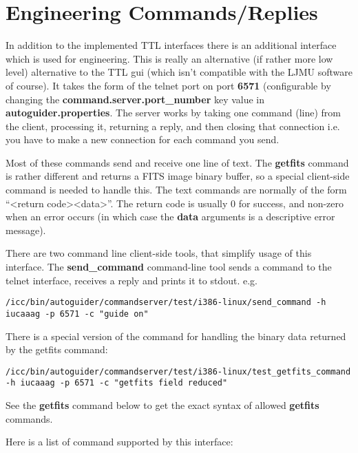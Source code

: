 \documentclass[10pt,a4paper]{article}
\begin{document}
\section{Engineering Commands/Replies}

In addition to the implemented TTL interfaces there is an additional interface which is used for engineering. This is really an alternative (if rather more low level) alternative to the TTL gui (which isn't compatible with the LJMU software of course). It takes the form of the telnet port on port {\bf 6571} (configurable by changing the {\bf command.server.port\_number} key value in {\bf autoguider.properties}. The server works by taking one command (line) from the client, processing it, returning a reply, and then closing that connection i.e. you have to make a new connection for each command you send.

Most of these commands send and receive one line of text. The {\bf getfits} command is rather different and returns a FITS image binary buffer, so a special client-side command is needed to handle this. The text commands are normally of the form ``\textless return code\textgreater \textless data\textgreater''. The return code is usually 0 for success, and non-zero when an error occurs (in which case the {\bf data} arguments is a descriptive error message). 

There are two command line client-side tools, that simplify usage of this interface. The {\bf send\_command} command-line tool sends a command to the telnet interface, receives a reply and prints it to stdout. e.g.
\begin{verbatim}
/icc/bin/autoguider/commandserver/test/i386-linux/send_command -h iucaaag -p 6571 -c "guide on"
\end{verbatim}
There is a special version of the command for handling the binary data returned by the getfits command:
\begin{verbatim}
/icc/bin/autoguider/commandserver/test/i386-linux/test_getfits_command -h iucaaag -p 6571 -c "getfits field reduced"
\end{verbatim}

See the {\bf getfits} command below to get the exact syntax of allowed {\bf getfits} commands.

Here is a list of command supported by this interface:
\end{document}
